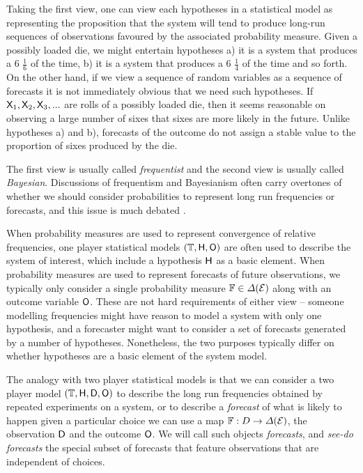 Taking the first view, one can view each hypotheses in a statistical model as representing the proposition that the system will tend to produce long-run sequences of observations favoured by the associated probability measure. Given a possibly loaded die, we might entertain hypotheses a) it is a system that produces a 6 $\frac{1}{6}$ of the time, b) it is a system that produces a 6 $\frac{1}{4}$ of the time and so forth. On the other hand, if we view a sequence of random variables as a sequence of forecasts it is not immediately obvious that we need such hypotheses. If $\mathsf{X}_1,\mathsf{X}_2,\mathsf{X}_3,...$ are rolls of a possibly loaded die, then it seems reasonable on observing a large number of sixes that sixes are more likely in the future. Unlike hypotheses a) and b), forecasts of the outcome do not assign a stable value to the proportion of sixes produced by the die. 

The first view is usually called \emph{frequentist} and the second view is usually called \emph{Bayesian}. Discussions of frequentism and Bayesianism often carry overtones of whether we should consider probabilities to represent long run frequencies or forecasts, and this issue is much debated \cite{hajek_interpretations_2019}.


When probability measures are used to represent convergence of relative frequencies, one player statistical models $(\mathbb{T},\mathsf{H},\mathsf{O})$ are often used to describe the system of interest, which include a hypothesis $\mathsf{H}$ as a basic element. When probability measures are used to represent forecasts of future observations, we typically only consider a single probability measure $\mathbb{F}\in \Delta(\mathcal{E})$ along with an outcome variable $\mathsf{O}$. These are not hard requirements of either view -- someone modelling frequencies might have reason to model a system with only one hypothesis, and a forecaster might want to consider a set of forecasts generated by a number of hypotheses. Nonetheless, the two purposes typically differ on whether hypotheses are a basic element of the system model.

The analogy with two player statistical models is that we can consider a two player model $(\mathbb{T},\mathsf{H},\mathsf{D},\mathsf{O})$ to describe the long run frequencies obtained by repeated experiments on a system, or to describe a \emph{forecast} of what is likely to happen given a particular choice we can use a map $\mathbb{F}:D\to \Delta(\mathcal{E})$, the observation $\mathsf{D}$ and the outcome $\mathsf{O}$. We will call such objects \emph{forecasts}, and \emph{see-do forecasts} the special subset of forecasts that feature observations that are independent of choices.

